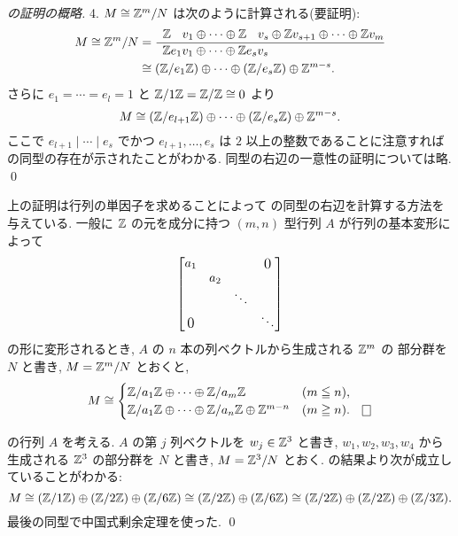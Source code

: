 \documentclass[12pt,twoside]{jarticle}
\begin{document}
\begin{proof}[の証明の概略]
 4. $M\cong{\mathbb Z}^m/N$ は次のように計算される(要証明):
 \begin{align*}
  M \cong \Z^m/N
  &=\frac
   {\,\,\,\Z\phantom{e_1}v_1\oplus\cdots\oplus\Z\phantom{e_1}v_s\oplus\Z v_{s+1}\oplus\cdots\oplus\Z v_m}
   {\Z e_1v_1\oplus\cdots\oplus\Z e_sv_s\phantom{\oplus\Z v_{s+1}\oplus\cdots\oplus\Z v_m}}
  \\ &
  \cong
  (\Z/e_1\Z)\oplus\cdots\oplus(\Z/e_s\Z)\oplus\Z^{m-s}.
 \end{align*}
 さらに $e_1=\cdots=e_l=1$ と ${\mathbb Z}/1{\mathbb Z}={\mathbb Z}/{\mathbb Z}\cong 0$ より
 \begin{equation*}
  M \cong ({\mathbb Z}/e_{l+1}{\mathbb Z})\oplus\cdots\oplus({\mathbb Z}/e_s{\mathbb Z})\oplus{\mathbb Z}^{m-s}.
 \end{equation*}
 ここで $e_{l+1}\mid\cdots\mid e_s$ でかつ %
 $e_{l+1},\ldots,e_s$ は $2$ 以上の整数であることに注意すれば
 の同型の存在が示されたことがわかる.
 同型の右辺の一意性の証明については略.
 \qed
\end{proof}

\begin{rem}
 上の証明は行列の単因子を求めることによって
 の同型の右辺を計算する方法を与えている.
 一般に ${\mathbb Z}$ の元を成分に持つ $(m,n)$ 型行列 $A$ が行列の基本変形によって
  \begin{equation*}
    \begin{bmatrix}
      a_1 &     &        &\bigzerou \\
          & a_2 &        &        \\
          &     & \ddots &        \\
      \bigzerol &  &     & \ddots \\
    \end{bmatrix}
  \end{equation*}
 の形に変形されるとき, $A$ の $n$ 本の列ベクトルから生成される ${\mathbb Z}^m$ の
 部分群を $N$ と書き, $M={\mathbb Z}^m/N$ とおくと, 
 \begin{equation*}
  M\cong
  \begin{cases}
   \Z/a_1\Z\oplus\cdots\oplus\Z/a_m\Z               & (m\leqq n), \\
   \Z/a_1\Z\oplus\cdots\oplus\Z/a_n\Z\oplus\Z^{m-n} & (m\geqq n). \qed \\
  \end{cases}
 \end{equation*}
\end{rem}

\begin{example}
 の行列 $A$ を考える.
 $A$ の第 $j$ 列ベクトルを $w_j\in{\mathbb Z}^3$ と書き, 
 $w_1,w_2,w_3,w_4$ から生成される ${\mathbb Z}^3$ の部分群を $N$ と書き, 
 $M={\mathbb Z}^3/N$ とおく.
 の結果より次が成立していることがわかる:
 \begin{equation*}
  M \cong ({\mathbb Z}/1{\mathbb Z})\oplus({\mathbb Z}/2{\mathbb Z})\oplus({\mathbb Z}/6{\mathbb Z})
    \cong ({\mathbb Z}/2{\mathbb Z})\oplus({\mathbb Z}/6{\mathbb Z})
    \cong ({\mathbb Z}/2{\mathbb Z})\oplus({\mathbb Z}/2{\mathbb Z})\oplus({\mathbb Z}/3{\mathbb Z}).
 \end{equation*}
 最後の同型で中国式剰余定理を使った.
 \qed
\end{example}
\end{document}
